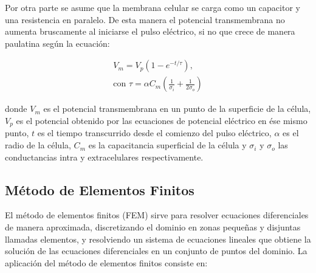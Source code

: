 \documentclass[a4paper,10pt]{article}
\begin{document}
Por otra parte se asume que la membrana celular se carga como un capacitor y una resistencia en paralelo. De esta manera el potencial transmembrana no aumenta bruscamente al iniciarse el pulso eléctrico, si no que crece de manera paulatina según la ecuación: 

\begin{equation} \label{eq:capacit} \begin{split}
	V_m = V_p (1 - e^{-t/\tau}) , \\ \textrm{con } \tau = \alpha C_m \left( \frac{1}{\sigma_i} + \frac{1}{2 \sigma_o} \right)
\end{split} \end{equation}

donde $V_m$ es el potencial transmembrana en un punto de la superficie de la célula, $V_p$ es el potencial obtenido por las ecuaciones de potencial eléctrico en ése mismo punto, $t$ es el tiempo transcurrido desde el comienzo del pulso eléctrico, $\alpha$ es el radio de la célula, $C_m$ es la capacitancia superficial de la célula y $\sigma_i$ y $\sigma_o$ las conductancias intra y extracelulares respectivamente.\\

\subsection{Método de Elementos Finitos}
El método de elementos finitos (FEM) sirve para resolver ecuaciones diferenciales de manera aproximada, discretizando el dominio en zonas pequeñas y disjuntas llamadas elementos, y resolviendo un sistema de ecuaciones lineales que obtiene la solución de las ecuaciones diferenciales en un conjunto de puntos del dominio. La aplicación del método de elementos finitos consiste en:
\end{document}
